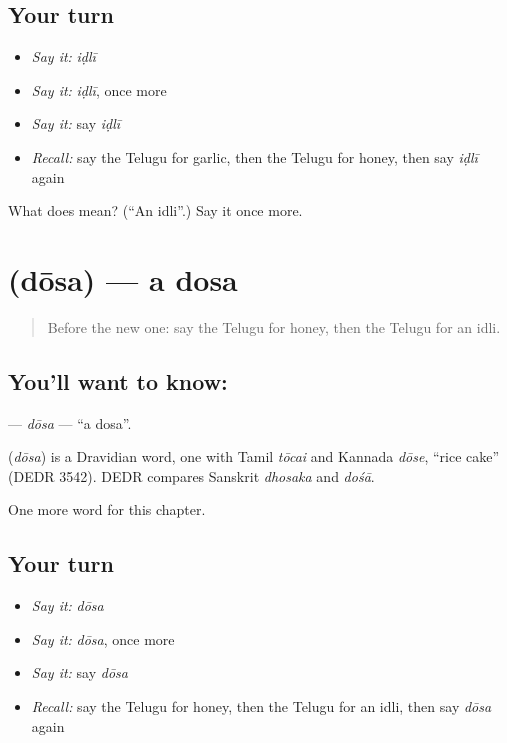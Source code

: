 \subsection*{Your turn}
\begin{itemize}
\raggedright
  \item \emph{Say it:} \emph{iḍlī}
  \item \emph{Say it:} \emph{iḍlī}, once more
  \item \emph{Say it:} say \emph{iḍlī}
  \item \emph{Recall:} say the Telugu for garlic, then the Telugu for honey, then say \emph{iḍlī} again
\end{itemize}

\begin{tcolorbox}[breakable,colback=teal!4,colframe=teal!35!black,title={Before you move on}]
What does  mean? (\textquotedblleft{}An idli\textquotedblright{}.) Say it once more.
\end{tcolorbox}
\section[\texorpdfstring{\te{దోశ} (dōsa)}{దోశ (dōsa)}]{ (dōsa) — a dosa}

\label{lesson:TE-C119-dosa}



\begin{quote}
Before the new one: say the Telugu for honey, then the Telugu for an idli.
\end{quote}

\subsection*{You'll want to know: }
\textbf{} — \emph{dōsa} — \textquotedblleft{}a dosa\textquotedblright{}.

\begin{cousinweb}
\textbf{} (\emph{dōsa}) is a Dravidian word, one with Tamil \emph{tōcai} and Kannada \emph{dōse}, \textquotedblleft{}rice cake\textquotedblright{} (DEDR 3542). DEDR compares Sanskrit \emph{dhosaka} and \emph{dośā}.
\end{cousinweb}

\begin{grammarlens}[title={What you've built}]
One more word for this chapter.
\end{grammarlens}

\subsection*{Your turn}
\begin{itemize}
\raggedright
  \item \emph{Say it:} \emph{dōsa}
  \item \emph{Say it:} \emph{dōsa}, once more
  \item \emph{Say it:} say \emph{dōsa}
  \item \emph{Recall:} say the Telugu for honey, then the Telugu for an idli, then say \emph{dōsa} again
\end{itemize}

